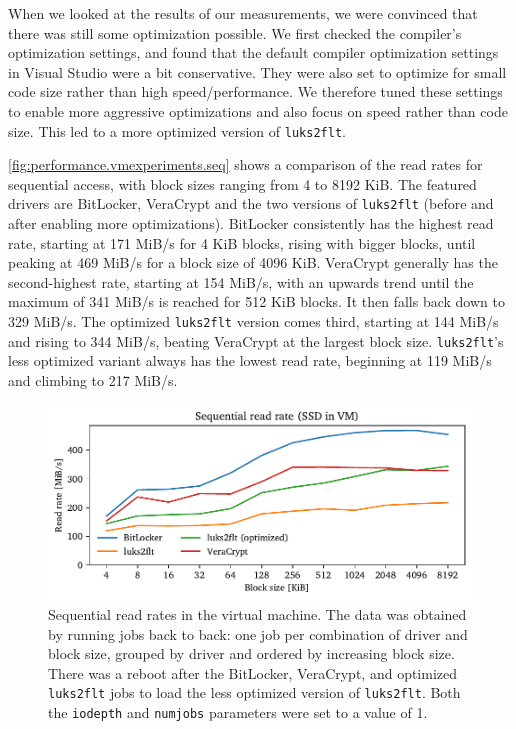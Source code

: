 When we looked at the results of our measurements, we were convinced that there was still some optimization possible. We first checked the compiler's optimization settings, and found that the default compiler optimization settings in Visual Studio were a bit conservative. They were also set to optimize for small code size rather than high speed/performance. We therefore tuned these settings to enable more aggressive optimizations and also focus on speed rather than code size. This led to a more optimized version of \texttt{luks2flt}.

\autoref{fig:performance.vmexperiments.seq} shows a comparison of the read rates for sequential access, with block sizes ranging from 4 to 8192 KiB. The featured drivers are BitLocker, VeraCrypt and the two versions of \texttt{luks2flt} (before and after enabling more optimizations). BitLocker consistently has the highest read rate, starting at 171 MiB/s for 4 KiB blocks, rising with bigger blocks, until peaking at 469 MiB/s for a block size of 4096 KiB. VeraCrypt generally has the second-highest rate, starting at 154 MiB/s, with an upwards trend until the maximum of 341 MiB/s is reached for 512 KiB blocks. It then falls back down to 329 MiB/s. The optimized \texttt{luks2flt} version comes third, starting at 144 MiB/s and rising to 344 MiB/s, beating VeraCrypt at the largest block size. \texttt{luks2flt}'s less optimized variant always has the lowest read rate, beginning at 119 MiB/s and climbing to 217 MiB/s.

\begin{figure}[htb!]
	\center
	\includegraphics[scale=1]{../fig/performance.vmexperiments.seq.pdf}
	\caption[
		Sequential read rates in the virtual machine
	]{
		Sequential read rates in the virtual machine. The data was obtained by running jobs back to back: one job per combination of driver and block size, grouped by driver and ordered by increasing block size. There was a reboot after the BitLocker, VeraCrypt, and optimized \texttt{luks2flt} jobs to load the less optimized version of \texttt{luks2flt}. Both the \texttt{iodepth} and \texttt{numjobs} parameters were set to a value of 1.
	}
	\label{fig:performance.vmexperiments.seq}
\end{figure}

